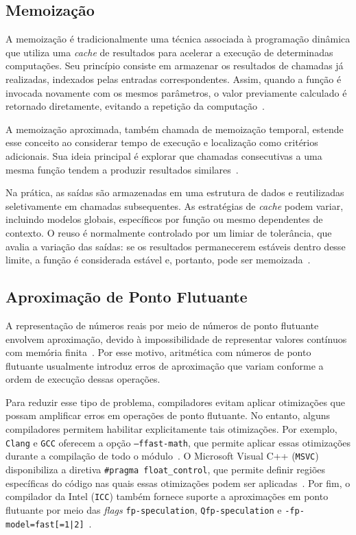 \subsection{Memoização}\label{subsec:memo}

A memoização é tradicionalmente uma técnica associada à programação dinâmica que utiliza uma \textit{cache} de resultados para acelerar a execução de determinadas computações. Seu princípio consiste em armazenar os resultados de chamadas já realizadas, indexados pelas entradas correspondentes. Assim, quando a função é invocada novamente com os mesmos parâmetros, o valor previamente calculado é retornado diretamente, evitando a repetição da computação~\cite{michie1968}.

A memoização aproximada, também chamada de memoização temporal, estende esse conceito ao considerar tempo de execução e localização como critérios adicionais. Sua ideia principal é explorar que chamadas consecutivas a uma mesma função tendem a produzir resultados similares~\cite{tziantzioulis2018}.

Na prática, as saídas são armazenadas em uma estrutura de dados e reutilizadas seletivamente em chamadas subsequentes. As estratégias de \textit{cache} podem variar, incluindo modelos globais, específicos por função ou mesmo dependentes de contexto. O reuso é normalmente controlado por um limiar de tolerância, que avalia a variação das saídas: se os resultados permanecerem estáveis dentro desse limite, a função é considerada estável e, portanto, pode ser memoizada~\cite{tziantzioulis2018}.

\subsection{Aproximação de Ponto Flutuante}\label{subsec:pontoFlut}

A representação de números reais por meio de números de ponto flutuante envolvem aproximação, devido à impossibilidade de representar valores contínuos com memória finita~\cite{monniaux2008}. Por esse motivo, aritmética com números de ponto flutuante usualmente introduz erros de aproximação que variam conforme a ordem de execução dessas operações.

Para reduzir esse tipo de problema, compiladores evitam aplicar otimizações que possam amplificar erros em operações de ponto flutuante. No entanto, alguns compiladores permitem habilitar explicitamente tais otimizações. Por exemplo, \texttt{Clang} e \texttt{GCC} oferecem a opção \texttt{--ffast-math}, que permite aplicar essas otimizações durante a compilação de todo o módulo~\cite{gccffast, clangffast}. O Microsoft Visual C++ (\texttt{MSVC}) disponibiliza a diretiva \texttt{\#pragma float\_control}, que permite definir regiões específicas do código nas quais essas otimizações podem ser aplicadas~\cite{msvcfast}. Por fim, o compilador da Intel (\texttt{ICC}) também fornece suporte a aproximações em ponto flutuante por meio das \textit{flags} \texttt{fp-speculation}, \texttt{Qfp-speculation} e \texttt{-fp-model=fast[=1|2]}~\cite{intelfast}.

